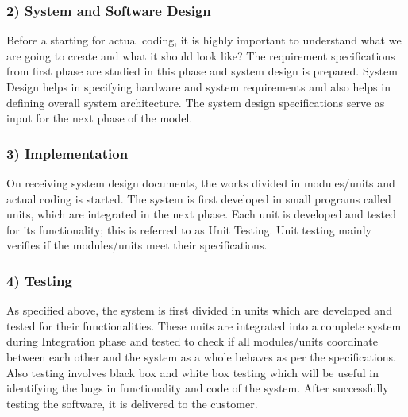 \subsubsection{2) System and Software Design}
Before a starting for actual coding, it is highly important to understand what we are going to create and what it should look like? The requirement specifications from first phase are studied in this phase and system design is prepared. System Design helps in specifying hardware and system requirements and also helps in defining overall system architecture. The system design specifications serve as input for the next phase of the model.\\
\subsubsection{3) Implementation}
On receiving system design documents, the works divided in modules/units and actual coding is started. The system is first developed in small programs called units, which are integrated in the next phase. Each unit is developed and tested for its functionality; this is referred to as Unit Testing. Unit testing mainly verifies if the modules/units meet their specifications.\\
\subsubsection{4) Testing}
As specified above, the system is first divided in units which are developed and tested for their functionalities. These units are integrated into a complete system during Integration phase and tested to check if all modules/units coordinate between each other and the system as a whole behaves as per the specifications. Also testing involves black box and white box testing which will be useful in identifying the bugs in functionality and code of the system. After successfully testing the software, it is delivered to the customer.